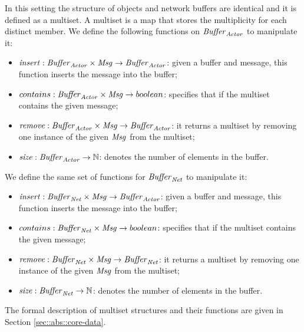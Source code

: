In this setting the structure of objects and network buffers are identical and it is defined as a multiset. A multiset is a map that stores the multiplicity for each distinct member. %
We define the following functions on $\mathit{Buffer}_{\it Actor}$ to manipulate it:
\begin{itemize} 
\item $\mathit{insert}:\mathit{Buffer}_{\it Actor} \times \mathit{Msg}\rightarrow \mathit{Buffer}_{\it Actor}$: given a buffer and message, this function inserts the message into the buffer;
\item $contains:\mathit{Buffer}_{\it Actor} \times \mathit{Msg} \rightarrow boolean$: specifies that if the multiset contains the given message;
\item $\mathit{remove}:\mathit{Buffer}_{\it Actor} \times \mathit{Msg} \rightarrow \mathit{Buffer}_{\it Actor} $: it returns a multiset by removing one instance of the given $\mathit{Msg}$ from the multiset;
\item $\mathit{size}:\mathit{Buffer}_{\it Actor} \rightarrow \mathbb{N}$: denotes the number of elements in the buffer.
\end{itemize}

We define the same set of functions for $\mathit{Buffer}_{\it Net}$ to manipulate it:
\begin{itemize} 
\item $\mathit{insert}:\mathit{Buffer}_{\it Net} \times \mathit{Msg}\rightarrow \mathit{Buffer}_{\it Actor}$: given a buffer and message, this function inserts the message into the buffer;
\item $contains:\mathit{Buffer}_{\it Net} \times \mathit{Msg} \rightarrow boolean$: specifies that if the multiset contains the given message;
\item $\mathit{remove}:\mathit{Buffer}_{\it Net} \times \mathit{Msg} \rightarrow \mathit{Buffer}_{\it Net} $: it returns a multiset by removing one instance of the given $\mathit{Msg}$ from the multiset;
\item $\mathit{size}:\mathit{Buffer}_{\it Net} \rightarrow \mathbb{N}$: denotes the number of elements in the buffer.
\end{itemize}
The formal description of multiset structures and their functions are given in Section \ref{sec::abs::core-data}.


